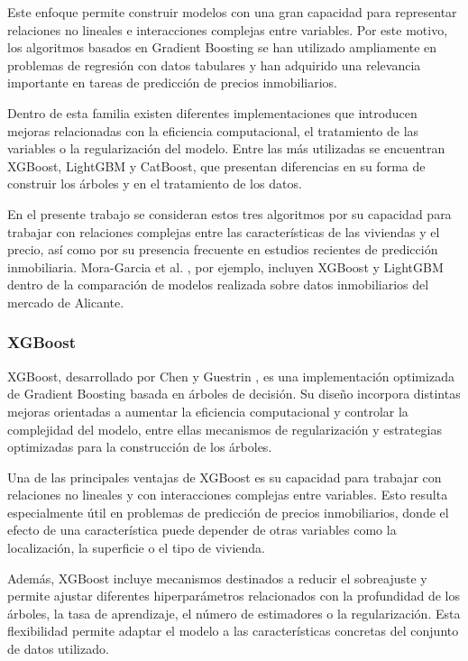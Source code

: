 \documentclass[IB]{TFUOC}%
\begin{document}
Este enfoque permite construir modelos con una gran capacidad para representar relaciones no lineales e interacciones complejas entre variables. Por este motivo, los algoritmos basados en Gradient Boosting se han utilizado ampliamente en problemas de regresión con datos tabulares y han adquirido una relevancia importante en tareas de predicción de precios inmobiliarios.

Dentro de esta familia existen diferentes implementaciones que introducen mejoras relacionadas con la eficiencia computacional, el tratamiento de las variables o la regularización del modelo. Entre las más utilizadas se encuentran XGBoost, LightGBM y CatBoost, que presentan diferencias en su forma de construir los árboles y en el tratamiento de los datos.

En el presente trabajo se consideran estos tres algoritmos por su capacidad para trabajar con relaciones complejas entre las características de las viviendas y el precio, así como por su presencia frecuente en estudios recientes de predicción inmobiliaria. Mora-Garcia et al. \cite{moragarcia2022housing}, por ejemplo, incluyen XGBoost y LightGBM dentro de la comparación de modelos realizada sobre datos inmobiliarios del mercado de Alicante.

\subsubsection{XGBoost}

XGBoost, desarrollado por Chen y Guestrin \cite{chen2016xgboost}, es una implementación optimizada de Gradient Boosting basada en árboles de decisión. Su diseño incorpora distintas mejoras orientadas a aumentar la eficiencia computacional y controlar la complejidad del modelo, entre ellas mecanismos de regularización y estrategias optimizadas para la construcción de los árboles.

Una de las principales ventajas de XGBoost es su capacidad para trabajar con relaciones no lineales y con interacciones complejas entre variables. Esto resulta especialmente útil en problemas de predicción de precios inmobiliarios, donde el efecto de una característica puede depender de otras variables como la localización, la superficie o el tipo de vivienda.

Además, XGBoost incluye mecanismos destinados a reducir el sobreajuste y permite ajustar diferentes hiperparámetros relacionados con la profundidad de los árboles, la tasa de aprendizaje, el número de estimadores o la regularización. Esta flexibilidad permite adaptar el modelo a las características concretas del conjunto de datos utilizado.
\end{document}
